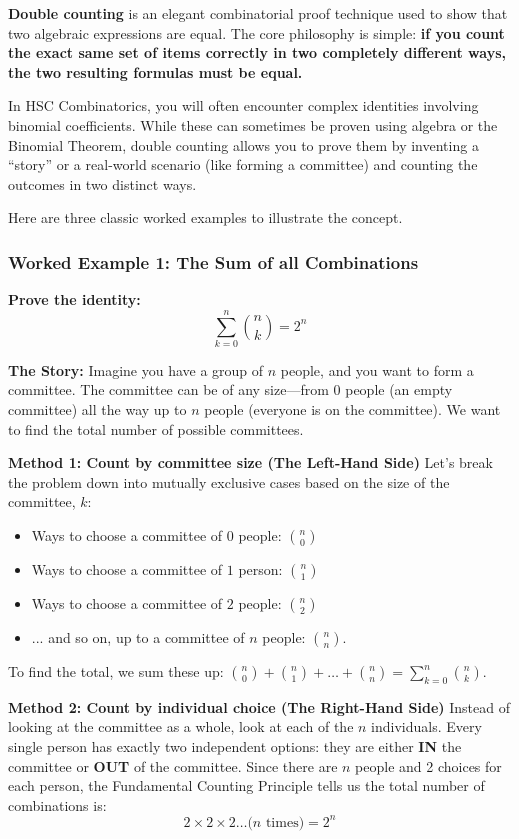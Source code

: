 \documentclass[12pt]{article}
\begin{document}
\textbf{Double counting} is an elegant combinatorial proof technique used to show that two algebraic expressions are equal. The core philosophy is simple: \textbf{if you count the exact same set of items correctly in two completely different ways, the two resulting formulas must be equal.}

In HSC Combinatorics, you will often encounter complex identities involving binomial coefficients. While these can sometimes be proven using algebra or the Binomial Theorem, double counting allows you to prove them by inventing a ``story'' or a real-world scenario (like forming a committee) and counting the outcomes in two distinct ways.

Here are three classic worked examples to illustrate the concept.

\subsubsection*{Worked Example 1: The Sum of all Combinations}

\textbf{Prove the identity:}
\[
\sum_{k=0}^{n} \binom{n}{k} = 2^n
\]

\textbf{The Story:}
Imagine you have a group of $n$ people, and you want to form a committee. The committee can be of any size---from $0$ people (an empty committee) all the way up to $n$ people (everyone is on the committee). We want to find the total number of possible committees.

\textbf{Method 1: Count by committee size (The Left-Hand Side)}
Let's break the problem down into mutually exclusive cases based on the size of the committee, $k$:
\begin{itemize}[leftmargin=*]
\item Ways to choose a committee of $0$ people: $\binom{n}{0}$
\item Ways to choose a committee of $1$ person: $\binom{n}{1}$
\item Ways to choose a committee of $2$ people: $\binom{n}{2}$
\item ... and so on, up to a committee of $n$ people: $\binom{n}{n}$.
\end{itemize}
To find the total, we sum these up: $\binom{n}{0} + \binom{n}{1} + \dots + \binom{n}{n} = \sum_{k=0}^{n} \binom{n}{k}$.

\textbf{Method 2: Count by individual choice (The Right-Hand Side)}
Instead of looking at the committee as a whole, look at each of the $n$ individuals. Every single person has exactly two independent options: they are either \textbf{IN} the committee or \textbf{OUT} of the committee.
Since there are $n$ people and 2 choices for each person, the Fundamental Counting Principle tells us the total number of combinations is:
\[
2 \times 2 \times 2 \dots \text{($n$ times)} = 2^n
\]
\end{document}

